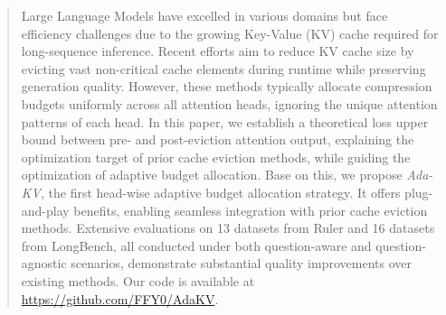 
\begin{abstract}
	Large Language Models have excelled in various domains but face efficiency challenges due to the growing Key-Value (KV) cache required for long-sequence inference.
	Recent efforts aim to reduce KV cache size by evicting vast non-critical cache elements during runtime while preserving generation quality.
	However, these methods typically allocate compression budgets uniformly across all attention heads, ignoring the unique attention patterns of each head.
	In this paper, we establish a theoretical loss upper bound between pre- and post-eviction attention output, explaining the optimization target of prior cache eviction methods, while guiding the optimization of adaptive budget allocation.
	Base on this, we propose {\it Ada-KV}, the first head-wise adaptive budget allocation strategy. It offers plug-and-play benefits, enabling seamless integration with prior cache eviction methods.
	Extensive evaluations on 13 datasets from Ruler and 16 datasets from LongBench, all conducted under both question-aware and question-agnostic scenarios, demonstrate substantial quality improvements over existing methods. Our code is available at \url{https://github.com/FFY0/AdaKV}.
\end{abstract} 